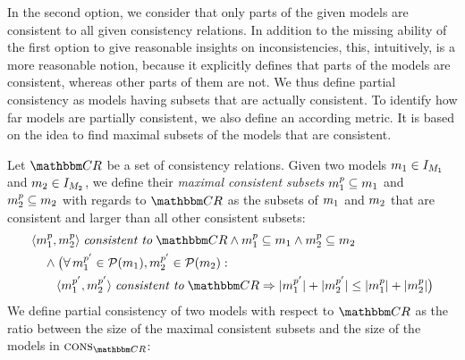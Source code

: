 In the second option, we consider that only parts of the given models are consistent to all given consistency relations.
In addition to the missing ability of the first option to give reasonable insights on inconsistencies, this, intuitively, is a more reasonable notion, because it explicitly defines that parts of the models are consistent, whereas other parts of them are not.
We thus define partial consistency as models having subsets that are actually consistent.
To identify how far models are partially consistent, we also define an according metric.
It is based on the idea to find maximal subsets of the models that are consistent.

\begin{definition} \label{def:partialconsistency}
    Let $\consistencyrelationset{CR}$ be a set of consistency relations.
    Given two models $m_{1} \in I_{M_{1}}$ and $m_{2} \in I_{M_{2}}$, we define their \emph{maximal consistent subsets} $m_{1}^p \subseteq m_{1}$ and $m_{2}^p \subseteq m_{2}$ with regards to $\consistencyrelationset{CR}$ as the subsets of $m_{1}$ and $m_{2}$ that are consistent and larger than all other consistent subsets:
    \begin{align*}
        & 
        \tupled{\model{m}{1}^p, \model{m}{2}^p} \consistenttomath \consistencyrelationset{CR} \land
        \model{m}{1}^p \subseteq \model{m}{1} \land \model{m}{2}^p \subseteq \model{m}{2}  \\
        & \formulaskip
        \land 
        \bigl( \forall \model{m}{1}^{p'} \in \mathcal{P}(\model{m}{1}), \model{m}{2}^{p'} \in \mathcal{P}(\model{m}{2}) : \\ %
        & \formulaskip\formulaskip
        \tupled{\model{m}{1}^{p'}, \model{m}{2}^{p'}} \consistenttomath \consistencyrelationset{CR} %
        \Rightarrow 
        \abs{\model{m}{1}^{p'}} + \abs{\model{m}{2}^{p'}} \leq \abs{\model{m}{1}^{p}} + \abs{\model{m}{2}^{p}} \bigr)
    \end{align*}
    We define partial consistency of two models with respect to $\consistencyrelationset{CR}$ as the ratio between the size of the maximal consistent subsets and the size of the models in $\function{cons}_{\consistencyrelationset{CR}}$:

\end{definition}
